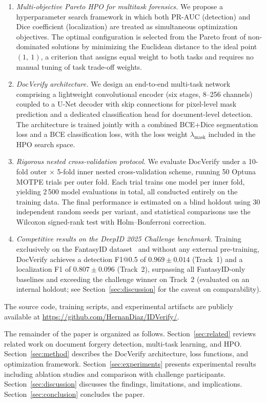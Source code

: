 \begin{enumerate}
  \item \textit{Multi-objective Pareto HPO for multitask forensics.}
    We propose a hyperparameter search framework in which both PR-AUC (detection)
    and Dice coefficient (localization) are treated as simultaneous optimization
    objectives. The optimal configuration is selected from the Pareto front of
    non-dominated solutions by minimizing the Euclidean distance to the ideal
    point~$(1,~1)$, a criterion that assigns equal weight to both tasks and
    requires no manual tuning of task trade-off weights.

  \item \textit{DocVerify architecture.}
    We design an end-to-end multi-task network comprising a lightweight
    convolutional encoder (six stages, 8--256 channels) coupled to a U-Net decoder
    with skip connections for pixel-level mask prediction and a dedicated
    classification head for document-level detection. The architecture is trained
    jointly with a combined BCE+Dice segmentation loss and a BCE classification
    loss, with the loss weight $\lambda_{\text{mask}}$ included in the HPO search
    space.

  \item \textit{Rigorous nested cross-validation protocol.}
    We evaluate DocVerify under a 10-fold outer $\times$ 5-fold inner nested
    cross-validation scheme, running 50 Optuna MOTPE trials per outer fold.
    Each trial trains one model per inner fold, yielding 2\,500 model evaluations
    in total, all conducted entirely on the training data. The final
    performance is estimated on a blind holdout using 30 independent random seeds
    per variant, and statistical comparisons use the Wilcoxon signed-rank test with
    Holm--Bonferroni correction.

  \item \textit{Competitive results on the DeepID 2025 Challenge benchmark.}
    Training exclusively on the FantasyID dataset~\cite{fantasyid2024} and without
    any external pre-training, DocVerify achieves a detection F1@0.5 of
    $0.969 \pm 0.014$ (Track~1) and a localization F1 of $0.807 \pm 0.096$
    (Track~2), surpassing all FantasyID-only baselines and exceeding the challenge
    winner on Track~2 (evaluated on an internal holdout; see Section~\ref{sec:discussion}
    for the caveat on comparability).
\end{enumerate}

The source code, training scripts, and experimental artifacts are publicly
available at \url{https://github.com/HernanDiaz/IDVerify/}.

The remainder of the paper is organized as follows. Section~\ref{sec:related}
reviews related work on document forgery detection, multi-task learning, and HPO.
Section~\ref{sec:method} describes the DocVerify architecture, loss functions, and
optimization framework. Section~\ref{sec:experiments} presents experimental results
including ablation studies and comparison with challenge participants.
Section~\ref{sec:discussion} discusses the findings, limitations, and implications.
Section~\ref{sec:conclusion} concludes the paper.
